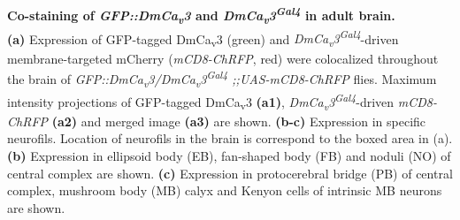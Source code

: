 \label{fig:S1}
\textbf{Co-staining of \emph{GFP::DmCa\textsubscript{v}3} and \emph{DmCa\textsubscript{v}3\textsuperscript{Gal4}} in adult brain.}
\\
\textbf{(a)} Expression of GFP-tagged DmCa\textsubscript{v}3 (green) and \emph{DmCa\textsubscript{v}3\textsuperscript{Gal4}}-driven membrane-targeted mCherry (\emph{mCD8-ChRFP}, red) were colocalized throughout the brain of \emph{GFP::DmCa\textsubscript{v}3/DmCa\textsubscript{v}3\textsuperscript{Gal4} ;;UAS-mCD8-ChRFP} flies.
Maximum intensity projections of GFP-tagged DmCa\textsubscript{v}3 \textbf{(a1)},  \emph{DmCa\textsubscript{v}3\textsuperscript{Gal4}}-driven \emph{mCD8-ChRFP} \textbf{(a2)} and merged image \textbf{(a3)} are shown.
\textbf{(b-c)} Expression in specific neurofils. Location of neurofils in the brain is correspond to the boxed area in (a).
\textbf{(b)} Expression in ellipsoid body (EB), fan-shaped body (FB) and noduli (NO) of central complex are shown.
\textbf{(c)} Expression in protocerebral bridge (PB) of central complex, mushroom body (MB) calyx and Kenyon cells of intrinsic MB neurons are shown. 
  
  